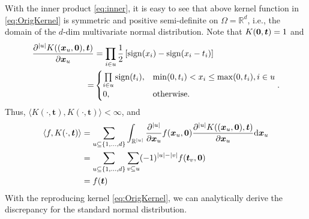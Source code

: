 \documentclass[graybox]{svmult}
\newcommand{\vx}{\boldsymbol{x}}
\newcommand{\vt}{\boldsymbol{t}}
\newcommand{\dif}{{\rm d}}
\DeclareMathOperator{\sign}{sign}
\begin{document}
With the inner product \eqref{eq:inner}, it is easy to see that above kernel function in \eqref{eq:OrigKernel} is symmetric and positive semi-definite on $\Omega = \mathbb{R}^d$, i.e., the domain of the $d$-dim multivariate normal distribution. 
Note that $K({\bf 0},\vt) = 1$ and
\begin{align*}
\frac{\partial^{|u|} K((\vx_u,{\bf 0}),\vt)}{\partial \vx_u}& =\prod_{i\in u}\frac 12 \left[\sign(x_i) - \sign(x_i - t_i) \right] \\
= &\begin{cases}
\prod\limits_{i\in u}\sign(t_i), & \min(0,t_i) < x_i \leq \max(0,t_i), i\in u\\
0, & \textrm{otherwise}.
\end{cases}.
\end{align*}
Thus, $\langle K(\cdot,\vt), K(\cdot,\vt) \rangle < \infty $, and
\begin{align*}
\langle f, K(\cdot,\vt) \rangle &= \sum_{u\subseteq \{1,...,d\}}\int_{\mathbb{R}^{|u|}}\frac{\partial^{|u|}}{\partial \vx_u}f(\vx_u,{\bf 0})\frac{\partial^{|u|} K((\vx_u,{\bf 0}),\vt)}{\partial \vx_u}\dif \vx_u \\
& =     \sum_{u\subseteq \{1,...,d\}}\sum_{v\subseteq u}(-1)^{|u|-|v|}f(\vt_v,{\bf 0})\\
& = f(\vt)
\end{align*}
With the reproducing kernel \eqref{eq:OrigKernel}, we can analytically derive the discrepancy for the standard normal distribution. 
\end{document}
